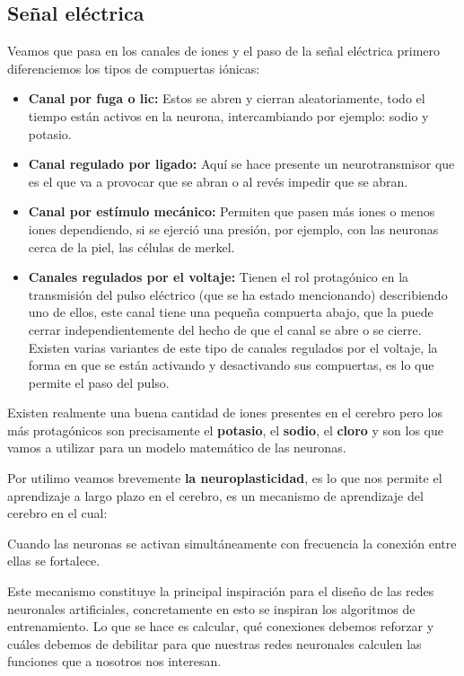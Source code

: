 \subsection{Señal eléctrica}
Veamos que pasa en los canales de iones y el paso de la señal eléctrica primero diferenciemos los tipos de compuertas iónicas:

\begin{itemize}
\item \textbf{Canal por fuga o lic:} Estos se abren y cierran aleatoriamente, todo el tiempo están activos en la neurona, intercambiando por ejemplo: sodio y potasio.
\item \textbf{Canal regulado por ligado:} Aquí se hace presente un neurotransmisor que es el que va a provocar que se abran o al revés impedir que se abran.
\item  \textbf{Canal por estímulo mecánico:} Permiten que pasen más iones o menos iones dependiendo, si se ejerció una presión, por ejemplo, con las neuronas cerca
de la piel, las células de merkel.
\item \textbf{Canales regulados por el voltaje:} Tienen el rol protagónico en la transmisión del pulso eléctrico (que se ha estado mencionando) describiendo uno de ellos, este canal tiene una pequeña compuerta abajo, que la puede cerrar independientemente del hecho de que el canal se abre o se cierre. Existen varias variantes de este tipo de canales regulados por el voltaje, la forma en que se están activando y desactivando sus compuertas, es lo que permite el paso del pulso.
\end{itemize}

Existen realmente una buena cantidad de iones presentes en el cerebro pero los más protagónicos son precisamente el \textbf{potasio}, el \textbf{sodio}, el \textbf{cloro} y son los que vamos a utilizar para un modelo matemático de las neuronas. 

Por utilimo veamos brevemente \textbf{la neuroplasticidad}, es lo que nos permite el aprendizaje a largo plazo en el cerebro, es un mecanismo de aprendizaje del cerebro en el cual:

Cuando las neuronas se activan simultáneamente con frecuencia la conexión entre ellas se fortalece.

Este mecanismo constituye la principal inspiración para el diseño de las redes neuronales artificiales, concretamente en esto se inspiran los algoritmos de entrenamiento. Lo que se hace es calcular, qué conexiones debemos reforzar y cuáles debemos de debilitar para que nuestras redes neuronales calculen las funciones que a nosotros nos interesan.






